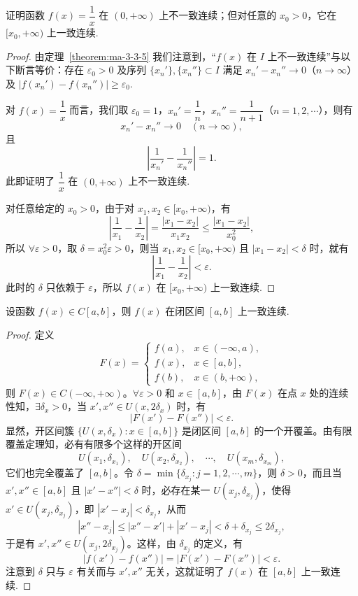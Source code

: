 \begin{example}\label{example:ma-3-3-8}
证明函数 $f(x)=\dfrac1x$ 在 $(0,+\infty)$ 上不一致连续；但对任意的 $x_0>0$，它在 $[x_0,+\infty)$ 上一致连续.
\end{example}


\begin{proof}
由定理~\ref{theorem:ma-3-3-5} 我们注意到，“$f(x)$ 在 $I$ 上不一致连续”与以下断言等价：存在 $\varepsilon_0>0$ 及序列 $\{x_n'\},\{x_n''\}\subset I$ 满足 $x_n'-x_n''\to0$（$n\to\infty$）及 $|f(x_n')-f(x_n'')|\geqslant\varepsilon_0$.

对 $f(x)=\dfrac1x$ 而言，我们取 $\varepsilon_0=1$，$x_n'=\dfrac1n$，$x_n''=\dfrac1{n+1}$（$n=1,2,\cdots$），则有
\[
  x_n'-x_n''\to0\quad(n\to\infty),
\]
且
\[
  \left|\frac1{x_n'}-\frac1{x_n''}\right|=1.
\]
此即证明了 $\dfrac1x$ 在 $(0,+\infty)$ 上不一致连续.

对任意给定的 $x_0>0$，由于对 $x_1,x_2\in[x_0,+\infty)$，有
\[
  \left|\frac1{x_1}-\frac1{x_2}\right|
  =
  \frac{|x_1-x_2|}{x_1x_2}
  \leqslant \frac{|x_1-x_2|}{x_0^2},
\]
所以 $\forall\varepsilon>0$，取 $\delta=x_0^2\varepsilon>0$，则当 $x_1,x_2\in[x_0,+\infty)$ 且 $|x_1-x_2|<\delta$ 时，就有
\[
  \left|\frac1{x_1}-\frac1{x_2}\right|<\varepsilon.
\]
此时的 $\delta$ 只依赖于 $\varepsilon$，所以 $f(x)$ 在 $[x_0,+\infty)$ 上一致连续.
\end{proof}


\begin{theorem}[{康托尔定理}]\label{theorem:ma-3-3-6}
设函数 $f(x)\in C[a,b]$，则 $f(x)$ 在闭区间 $[a,b]$ 上一致连续.
\end{theorem}


\begin{proof}
定义
\[
  F(x)=
  \begin{cases}
    f(a), & x\in(-\infty,a),\\
    f(x), & x\in[a,b],\\
    f(b), & x\in(b,+\infty),
  \end{cases}
\]
则 $F(x)\in C(-\infty,+\infty)$。$\forall\varepsilon>0$ 和 $x\in[a,b]$，由 $F(x)$ 在点 $x$ 处的连续性知，$\exists\delta_x>0$，当 $x',x''\in U(x,2\delta_x)$ 时，有
\[
  |F(x')-F(x'')|<\varepsilon.
\]
显然，开区间簇 $\{U(x,\delta_x):x\in[a,b]\}$ 是闭区间 $[a,b]$ 的一个开覆盖。由有限覆盖定理知，必有有限多个这样的开区间
\[
  U(x_1,\delta_{x_1}),\quad U(x_2,\delta_{x_2}),\quad \cdots,\quad U(x_m,\delta_{x_m}),
\]
它们也完全覆盖了 $[a,b]$。令 $\delta=\min\{\delta_{x_j}:j=1,2,\cdots,m\}$，则 $\delta>0$，而且当 $x',x''\in[a,b]$ 且 $|x'-x''|<\delta$ 时，必存在某一 $U(x_j,\delta_{x_j})$，使得 $x'\in U(x_j,\delta_{x_j})$，即 $|x'-x_j|<\delta_{x_j}$，从而
\[
  |x''-x_j|\leqslant |x''-x'|+|x'-x_j|<\delta+\delta_{x_j}\leqslant2\delta_{x_j},
\]
于是有 $x',x''\in U(x_j,2\delta_{x_j})$。这样，由 $\delta_{x_j}$ 的定义，有
\[
  |f(x')-f(x'')|=|F(x')-F(x'')|<\varepsilon.
\]
注意到 $\delta$ 只与 $\varepsilon$ 有关而与 $x',x''$ 无关，这就证明了 $f(x)$ 在 $[a,b]$ 上一致连续.
\end{proof}


